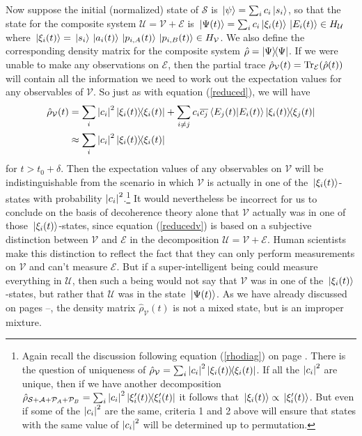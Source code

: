     Now suppose the initial (normalized) state of $\mathcal{S}$ is $\ket*{\psi}=\sum_i c_i\ket*{s_i}$, so that the state for the composite system $\mathcal{U}=\mathcal{V}+\mathcal{E}$ is $\ket*{\Psi(t)}=\sum_i c_i \ket*{\xi_i(t)}\ket*{E_i(t)}\in H_{\mathcal{U}}$ where $\ket*{\xi_i(t)}=\ket*{s_i}\ket*{a_i(t)}\ket*{p_{i,A}(t)}\ket*{p_{i,B}(t)}\in H_{\mathcal{V}}$. %
     We also define the corresponding density matrix for the composite system $\hat{\rho}=\dyad{\Psi}$. If we were unable to make any observations on $\mathcal{E}$, then 
     the partial trace
    $\hat{\rho}_{\mathcal{V}}(t)=\operatorname{Tr}_\mathcal{E}(\hat{\rho}(t))$ will contain all the information we need to work out the expectation values for any observables of  $\mathcal{V}.$ So just as with equation (\ref{reduced}), we will have
    \begin{equation} \label{reducedv}
    \begin{split}
      \hat{\rho}_{\mathcal{V}}(t)&=\sum_{i}\abs{c_i}^2\dyad{\xi_i(t)}+\sum_{i\neq j}c_i\overline{c_j}\ip{E_j(t)}{E_i(t)}\dyad{\xi_i(t)}{\xi_j(t)}\\
      &\approx \sum_{i}\abs{c_i}^2\dyad{\xi_i(t)}
      \end{split}\end{equation}
      for $t>t_0+\delta.$ Then the expectation values of any observables on $\mathcal{V}$ will be indistinguishable from the scenario in which $\mathcal{V}$ is actually in one of the $\ket*{\xi_i(t)}$-states { with probability $\abs{c_i}^2$.\footnote{Again recall the discussion following equation (\ref{rhodiag}) on page \pageref{rhodiag}. There is the question of uniqueness of $\hat{\rho}_{\mathcal{V}}=\sum_{i}\abs{c_i}^2\dyad{\xi_i(t)}$. If all the $\abs{c_i}^2$ are unique, then if we have another decomposition $\hat{\rho}_{\mathcal{S}+\mathcal{A}+\mathcal{P}_A+\mathcal{P}_B}=\sum_{i}\abs{c_i}^2\dyad{\xi_i'(t)}$ it follows that $\ket*{\xi_i(t)}\propto\ket*{\xi_i'(t)}$. But even if some of the $\abs{c_i}^2$ are the same, criteria 1 and 2 above will ensure that states with the same  value of $\abs{c_i}^2$ will be determined up to permutation.} It would nevertheless be} incorrect for us to conclude on the basis of decoherence theory alone that $\mathcal{V}$ actually was in one of those $\ket*{\xi_i(t)}$-states, since equation (\ref{reducedv}) is based on a subjective distinction between $\mathcal{V}$ and $\mathcal{E}$ in the decomposition $\mathcal{U}=\mathcal{V}+\mathcal{E}.$ Human scientists make this distinction to reflect the fact that they can only perform measurements on $\mathcal{V}$ and can't measure $\mathcal{E}$. But if a super-intelligent being could measure everything in  $\mathcal{U}$, then such a being would not say that $\mathcal{V}$ was in one of the  $\ket*{\xi_i(t)}$-states, but rather that $\mathcal{U}$ was in the state $\ket*{\Psi(t)}$. As we have already discussed on pages \pageref{subtle}--\pageref{subtleend}, the density matrix $ \hat{\rho}_{\mathcal{V}}(t)$ is not a mixed state, but is an improper mixture. 
    
